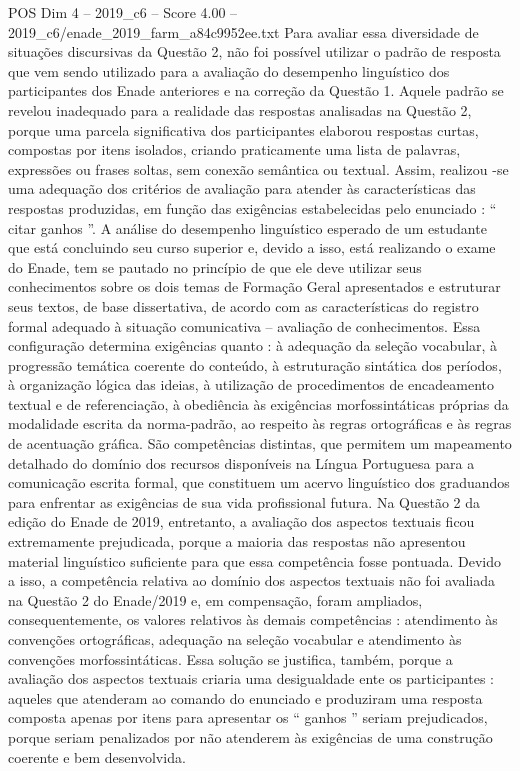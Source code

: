\begin{textsample}{POS Dim 4 – 2019\_c6 – Score 4.00 – 2019\_c6/enade\_2019\_farm\_a84c9952ee.txt}
Para avaliar essa diversidade de situações discursivas da Questão 2, não foi possível utilizar o padrão de resposta que vem sendo utilizado para a avaliação do desempenho linguístico dos participantes dos Enade anteriores e na correção da Questão 1.
Aquele padrão se revelou inadequado para a realidade das respostas analisadas na Questão 2, porque uma parcela significativa dos participantes elaborou respostas curtas, compostas por itens isolados, criando praticamente uma lista de palavras, expressões ou frases soltas, sem conexão semântica ou textual.
Assim, realizou -se uma adequação dos critérios de avaliação para atender às características das respostas produzidas, em função das exigências estabelecidas pelo enunciado : “ citar ganhos ”.
A análise do desempenho linguístico esperado de um estudante que está concluindo seu curso superior e, devido a isso, está realizando o exame do Enade, tem se pautado no princípio de que ele deve utilizar seus conhecimentos sobre os dois temas de Formação Geral apresentados e estruturar seus textos, de base dissertativa, de acordo com as características do registro formal adequado à situação comunicativa – avaliação de conhecimentos.
Essa configuração determina exigências quanto : à adequação da seleção vocabular, à progressão temática coerente do conteúdo, à estruturação sintática dos períodos, à organização lógica das ideias, à utilização de procedimentos de encadeamento textual e de referenciação, à obediência às exigências morfossintáticas próprias da modalidade escrita da norma-padrão, ao respeito às regras ortográficas e às regras de acentuação gráfica.
São competências distintas, que permitem um mapeamento detalhado do domínio dos recursos disponíveis na Língua Portuguesa para a comunicação escrita formal, que constituem um acervo linguístico dos graduandos para enfrentar as exigências de sua vida profissional futura.
Na Questão 2 da edição do Enade de 2019, entretanto, a avaliação dos aspectos textuais ficou extremamente prejudicada, porque a maioria das respostas não apresentou material linguístico suficiente para que essa competência fosse pontuada.
Devido a isso, a competência relativa ao domínio dos aspectos textuais não foi avaliada na Questão 2 do Enade/2019 e, em compensação, foram ampliados, consequentemente, os valores relativos às demais competências : atendimento às convenções ortográficas, adequação na seleção vocabular e atendimento às convenções morfossintáticas.
Essa solução se justifica, também, porque a avaliação dos aspectos textuais criaria uma desigualdade ente os participantes : aqueles que atenderam ao comando do enunciado e produziram uma resposta composta apenas por itens para apresentar os “ ganhos ” seriam prejudicados, porque seriam penalizados por não atenderem às exigências de uma construção coerente e bem desenvolvida.

\end{textsample}
